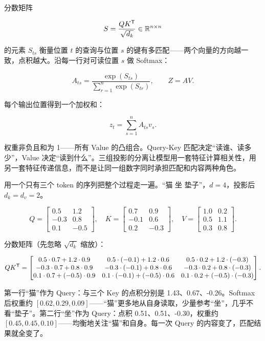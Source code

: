 分数矩阵

\[
S = \frac{QK^{\mathsf{T}}}{\sqrt{d_k}} \in \mathbb{R}^{n\times n}
\]

的元素 \(S_{ts}\) 衡量位置 \(t\) 的查询与位置 \(s\) 的键有多匹配——两个向量的方向越一致，点积越大。沿每一行对可读位置 \(s\) 做 Softmax：

\[
A_{ts} = \frac{\exp(S_{ts})}{\sum_{r=1}^{n}\exp(S_{tr})},\qquad
Z = AV.
\]

每个输出位置得到一个加权和：

\[
z_t = \sum_{s=1}^{n} A_{ts} v_s.
\]

权重非负且和为 1——所有 Value 的凸组合。Query-Key 匹配决定``读谁、读多少''，Value 决定``读到什么''。三组投影的分离让模型用一套特征计算相关性，用另一套特征传递信息，而不是让同一组数字同时承担匹配和内容两种角色。

用一个只有三个 token 的序列把整个过程走一遍。``猫 坐 垫子''，\(d=4\)，投影后 \(d_k=d_v=2\)。

\[
Q = \begin{bmatrix} 0.5 & 1.2 \\ -0.3 & 0.8 \\ 0.1 & -0.5 \end{bmatrix},\quad
K = \begin{bmatrix} 0.7 & 0.9 \\ -0.1 & 0.6 \\ 0.2 & -0.3 \end{bmatrix},\quad
V = \begin{bmatrix} 1.0 & 0.2 \\ 0.5 & 1.1 \\ 0.3 & 0.8 \end{bmatrix}.
\]

分数矩阵（先忽略 \(\sqrt{d_k}\) 缩放）：

\[
QK^{\mathsf{T}} = \begin{bmatrix}
0.5\cdot 0.7+1.2\cdot 0.9 & 0.5\cdot(-0.1)+1.2\cdot 0.6 & 0.5\cdot 0.2+1.2\cdot(-0.3) \\
-0.3\cdot 0.7+0.8\cdot 0.9 & -0.3\cdot(-0.1)+0.8\cdot 0.6 & -0.3\cdot 0.2+0.8\cdot(-0.3) \\
0.1\cdot 0.7+(-0.5)\cdot 0.9 & 0.1\cdot(-0.1)+(-0.5)\cdot 0.6 & 0.1\cdot 0.2+(-0.5)\cdot(-0.3)
\end{bmatrix}.
\]

第一行``猫''作为 Query：与三个 Key 的点积分别是 1.43、0.67、-0.26。Softmax 后权重约 \([0.62, 0.29, 0.09]\)——``猫''更多地从自身读取，少量参考``坐''，几乎不看``垫子''。第二行``坐''作为 Query：点积 0.51、0.51、-0.30，权重约 \([0.45, 0.45, 0.10]\)——均衡地关注``猫''和自身。每一次 Query 的内容变了，匹配结果就全变了。

